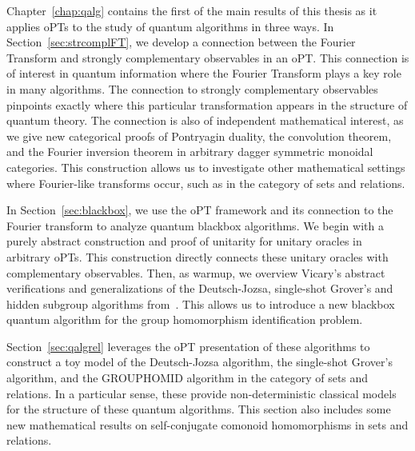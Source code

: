 Chapter~\ref{chap:qalg} contains the first of the main results of this thesis as it applies oPTs to the study of quantum algorithms in three ways.  In Section~\ref{sec:strcomplFT}, we develop a connection between the Fourier Transform and strongly complementary observables in an oPT.  This connection is of interest in quantum information where the Fourier Transform plays a key role in many algorithms.  The connection to strongly complementary observables pinpoints exactly where this particular transformation appears in the structure of quantum theory.  The connection is also of independent mathematical interest, as we give new categorical proofs of Pontryagin duality, the convolution theorem, and the Fourier inversion theorem in arbitrary dagger symmetric monoidal categories. This construction allows us to investigate other mathematical settings where Fourier-like transforms occur, such as in the category of sets and relations.

In Section~\ref{sec:blackbox}, we use the oPT framework and its connection to the Fourier transform to analyze quantum blackbox algorithms.  We begin with a purely abstract construction and proof of unitarity for unitary oracles in arbitrary oPTs. This construction directly connects these unitary oracles with complementary observables. Then, as warmup, we overview Vicary's abstract verifications and generalizations  of the Deutsch-Jozsa, single-shot Grover's and hidden subgroup algorithms from~\cite{vicary-tqa}.  This allows us to introduce a new blackbox quantum algorithm for the group homomorphism identification problem. 

Section~\ref{sec:qalgrel} leverages the oPT presentation of these algorithms to construct a toy model of the Deutsch-Jozsa algorithm, the single-shot Grover's algorithm, and the GROUPHOMID algorithm in the category of sets and relations. In a particular sense, these provide non-deterministic classical models for the structure of these quantum algorithms. This section also includes some new mathematical results on self-conjugate comonoid homomorphisms in sets and relations.

